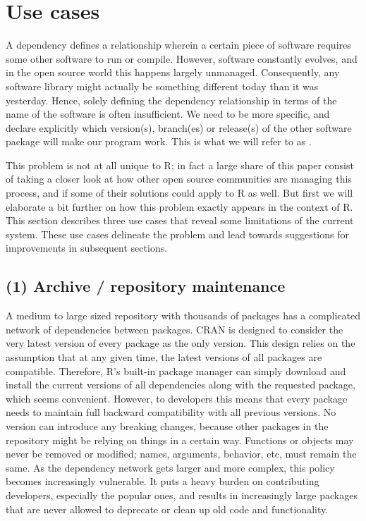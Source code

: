 \section{Use cases}

A dependency defines a relationship wherein a certain piece of software requires
some other software to run or compile. However, software constantly evolves, and in
the open source world this happens largely unmanaged. Consequently, any software
library might actually be something different today than it was yesterday.
Hence, solely defining the dependency relationship in terms of the name of the
software is often insufficient. We need to be more specific, and declare
explicitly which version(s), branch(es) or release(s) of the other software
package will make our program work. This is what we will refer to as
.

This problem is not at all unique to R; in fact a large share of this paper
consist of taking a closer look at how other open source communities are
managing this process, and if some of their solutions could apply to R as
well. But first we will elaborate a bit further on how this problem exactly
appears in the context of R. This section describes three use cases that
reveal some limitations of the current system. These use cases delineate
the problem and lead towards suggestions for improvements in subsequent sections.

\subsection{(1) Archive / repository maintenance}

A medium to large sized repository with thousands of packages has a complicated
network of dependencies between packages. CRAN is designed to consider the very
latest version of every package as the only  version. This design
relies on the assumption that at any given time, the latest versions
of all packages are compatible. Therefore, R's built-in package manager can simply
download and install the current versions of all dependencies along with the
requested package, which seems convenient. However, to developers this means
that every package   needs to maintain full backward compatibility
with all previous versions. No version can introduce any breaking changes, because
other packages in the repository might be relying on things in a certain way.
Functions or objects may never be removed or modified; names, arguments, behavior,
etc, must remain the same. As the dependency network gets larger and more complex,
this policy becomes increasingly vulnerable. It puts a heavy burden on
contributing developers, especially the popular ones, and results in
increasingly large packages that are never allowed to deprecate or clean up
old code and functionality.

